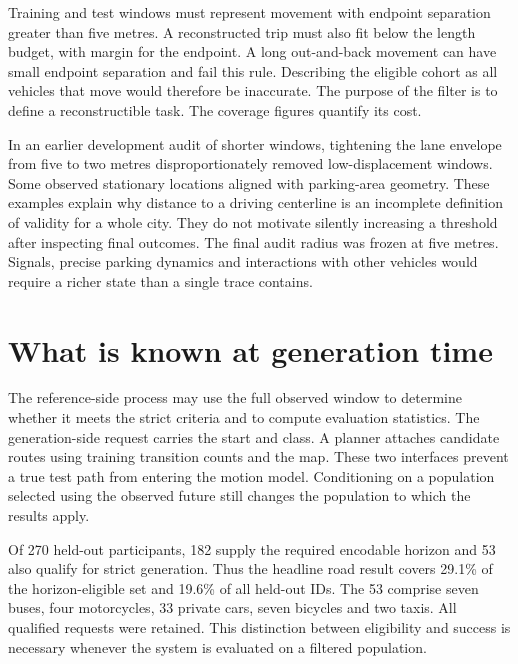 

Training and test windows must represent movement with endpoint separation greater than five metres. A reconstructed trip must also fit below the length budget, with margin for the endpoint. A long out-and-back movement can have small endpoint separation and fail this rule. Describing the eligible cohort as all vehicles that move would therefore be inaccurate. The purpose of the filter is to define a reconstructible task. The coverage figures quantify its cost.

In an earlier development audit of shorter windows, tightening the lane envelope from five to two metres disproportionately removed low-displacement windows. Some observed stationary locations aligned with parking-area geometry. These examples explain why distance to a driving centerline is an incomplete definition of validity for a whole city. They do not motivate silently increasing a threshold after inspecting final outcomes. The final audit radius was frozen at five metres. Signals, precise parking dynamics and interactions with other vehicles would require a richer state than a single trace contains.

\section{What is known at generation time}
The reference-side process may use the full observed window to determine whether it meets the strict criteria and to compute evaluation statistics. The generation-side request carries the start and class. A planner attaches candidate routes using training transition counts and the map. These two interfaces prevent a true test path from entering the motion model. Conditioning on a population selected using the observed future still changes the population to which the results apply.

Of 270 held-out participants, 182 supply the required encodable horizon and 53 also qualify for strict generation. Thus the headline road result covers 29.1\% of the horizon-eligible set and 19.6\% of all held-out IDs. The 53 comprise seven buses, four motorcycles, 33 private cars, seven bicycles and two taxis. All qualified requests were retained. This distinction between eligibility and success is necessary whenever the system is evaluated on a filtered population.
